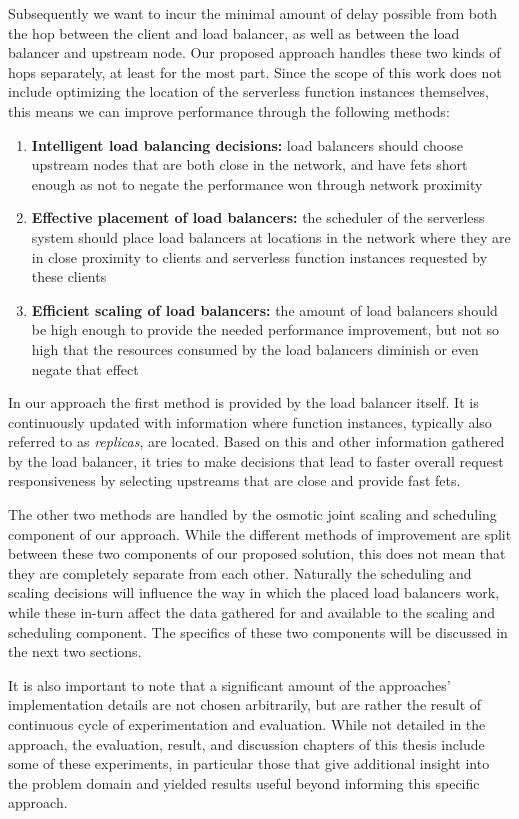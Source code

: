 \documentclass[draft,final]{vutinfth} %
\begin{document}
Subsequently we want to incur the minimal amount of delay possible from both the hop between the client and load balancer, as well as between the load balancer and upstream node. Our proposed approach handles these two kinds of hops separately, at least for the most part. Since the scope of this work does not include optimizing the location of the serverless function instances themselves, this means we can improve performance through the following methods:
\begin{enumerate}
    \item \textbf{Intelligent load balancing decisions:} load balancers should choose upstream nodes that are both close in the network, and have \glspl{fet} short enough as not to negate the performance won through network proximity
    \item \textbf{Effective placement of load balancers:} the scheduler of the serverless system should place load balancers at locations in the network where they are in close proximity to clients and serverless function instances requested by these clients
    \item \textbf{Efficient scaling of load balancers:} the amount of load balancers should be high enough to provide the needed performance improvement, but not so high that the resources consumed by the load balancers diminish or even negate that effect
\end{enumerate}
In our approach the first method is provided by the load balancer itself. It is continuously updated with information where function instances, typically also referred to as \textit{replicas}, are located. Based on this and other information gathered by the load balancer, it tries to make decisions that lead to faster overall request responsiveness by selecting upstreams that are close and provide fast \glspl{fet}.

The other two methods are handled by the osmotic joint scaling and scheduling component of our approach. While the different methods of improvement are split between these two components of our proposed solution, this does not mean that they are completely separate from each other. Naturally the scheduling and scaling decisions will influence the way in which the placed load balancers work, while these in-turn affect the data gathered for and available to the scaling and scheduling component. The specifics of these two components will be discussed in the next two sections. 

It is also important to note that a significant amount of the approaches' implementation details are not chosen arbitrarily, but are rather the result of continuous cycle of experimentation and evaluation. While not detailed in the approach, the evaluation, result, and discussion chapters of this thesis include some of these experiments, in particular those that give additional insight into the problem domain and yielded results useful beyond informing this specific approach.
\end{document}
